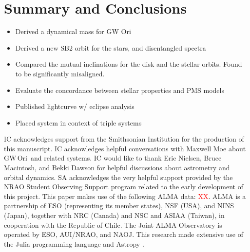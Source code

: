 \documentclass[twocolumn]{aastex61}
\newcommand{\todo}[1]{ \textcolor{red}{#1}}
\newcommand{\obj}{GW\,Ori}
\begin{document}
\section{Summary and Conclusions} \label{sec:summary}

\begin{itemize}
\item Derived a dynamical mass for GW Ori
\item Derived a new SB2 orbit for the stars, and disentangled spectra
\item Compared the mutual inclinations for the disk and the stellar orbits. Found to be significantly misaligned.
\item Evaluate the concordance between stellar properties and PMS models
\item Published lightcurve w/ eclipse analysis
\item Placed system in context of triple systems
\end{itemize}

\acknowledgments
IC acknowledges support from the Smithsonian Institution for the production of this manuscript. IC acknowledges helpful conversations with Maxwell Moe about \obj\ and related systems. IC would like to thank Eric Nielsen, Bruce Macintosh, and Bekki Dawson for helpful discussions about astrometry and orbital dynamics. SA acknowledges the very helpful support provided by the NRAO Student Observing Support program related to the early development of this project.  This paper makes use of the following ALMA data: \todo{XX}. ALMA is a partnership of ESO (representing its member states), NSF (USA), and NINS (Japan), together with NRC (Canada) and NSC and ASIAA (Taiwan), in cooperation with the Republic of Chile.  The Joint ALMA Observatory is operated by ESO, AUI/NRAO, and NAOJ.  This research made extensive use of the Julia programming language \citep{bezanson17} and Astropy \citep{astropy13}.




\end{document}
